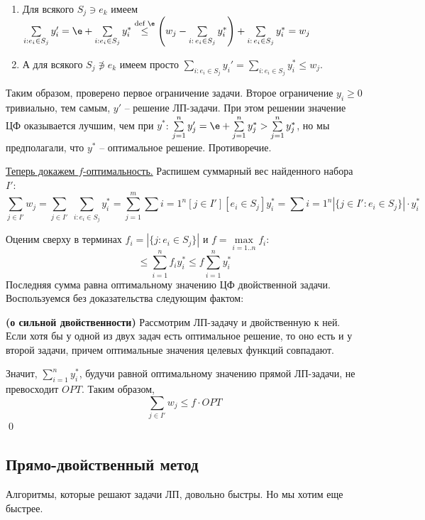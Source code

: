 \begin{enumerate}
\item Для всякого $S_j \ni e_k$ имеем $\sum\limits_{i: e_i \in S_j} y_i' = \e + \sum\limits_{i: e_i \in S_j} y_i^* \overset{\text{def }\e}{\leq} \left(w_j - \sum\limits_{i:\, e_i \in S_j}y_i^*\right) + \sum\limits_{i:\, e_i \in S_j}y_i^* = w_j$

\item А для всякого $S_j \not\ni e_k$ имеем просто $\sum\limits_{i: e_i \in S_j} y_i' = \sum\limits_{i: e_i \in S_j} y_i^* \leq w_j$.
\end{enumerate}

Таким образом, проверено первое ограничение задачи. Второе ограничение $y_i \geq 0$ тривиально, тем самым, $y'$ -- решение ЛП-задачи. При этом решении значение ЦФ оказывается лучшим, чем при $y^*$: $\sum\limits_{j=1}^ny_j' = \e + \sum\limits_{j=1}^n y_j^* > \sum\limits_{j=1}^n y_j^*$, но мы предполагали, что $y^*$ -- оптимальное решение. Противоречие.

\underline{Теперь докажем $f$-оптимальность.}
Распишем суммарный вес найденного набора $I'$:
$$\sum_{j\in I'} w_j = \sum_{j\in I'} \; \sum_{i: e_i \in S_j} y_i^* = \sum_{j=1}^m\sum{i=1}^n [j \in I'] [e_i \in S_j] y_i^* = \sum{i=1}^n|\{j \in I': e_i \in S_j\}|\cdot y_i^*$$

Оценим сверху в терминах $f_i = |\{j: e_i \in S_j\}|$ и $f = \max\limits_{i=1..n} f_i$:
$$ \leq \sum_{i=1}^nf_iy_i^* \leq f\sum_{i=1}^n y_i^*$$
Последняя сумма равна оптимальному значению ЦФ двойственной задачи. Воспользуемся без доказательства следующим фактом:

\begin{theorem*}{\bfseries (о сильной двойственности)}
	Рассмотрим ЛП-задачу и двойственную к ней. Если хотя бы у одной из двух задач есть оптимальное решение, то оно есть и у второй задачи, причем оптимальные значения целевых функций совпадают.
\end{theorem*}

Значит, $\sum\limits_{i=1}^n y_i^*$, будучи равной оптимальному значению прямой ЛП-задачи, не превосходит $OPT$. Таким образом, $$\sum_{j\in I'} w_j \leq f\cdot OPT$$\qed

\subsection{Прямо-двойственный метод}

Алгоритмы, которые решают задачи ЛП, довольно быстры. Но мы хотим еще быстрее.

